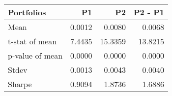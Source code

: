\begin{tabular}{lrrr}
\toprule
Portfolios & P1 & P2 & P2 - P1 \\
\midrule
Mean & 0.0012 & 0.0080 & 0.0068 \\
t-stat of mean & 7.4435 & 15.3359 & 13.8215 \\
p-value of mean & 0.0000 & 0.0000 & 0.0000 \\
Stdev & 0.0013 & 0.0043 & 0.0040 \\
Sharpe & 0.9094 & 1.8736 & 1.6886 \\
\bottomrule
\end{tabular}
